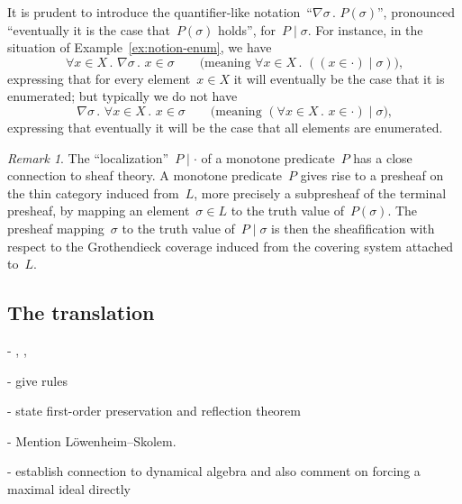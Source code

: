 \documentclass[com,11pt,crcready]{iosart2x}
\theoremstyle{definition}
\theoremstyle{plain}
\theoremstyle{remark}
\newtheorem{remark}[definition]{Remark}
\renewcommand{\_}{\mathpunct{.}\,}
\begin{document}
It is prudent to introduce the quantifier-like notation~``$\nabla \sigma\_
P(\sigma)$'', pronounced ``eventually it is the case that~$P(\sigma)$ holds'',
for~$P \mid \sigma$. For instance, in the situation of
Example~\ref{ex:notion-enum}, we have
\[ \forall x \in X\_ \nabla \sigma\_ x \in \sigma
\qquad\text{(meaning $\forall x \in X\_ ((x \in \cdot) \mid \sigma)$),} \]
expressing that for every element~$x \in X$ it will eventually be the case that
it is enumerated; but typically we do not have
\[ \nabla \sigma\_ \forall x \in X\_ x \in \sigma
\qquad\text{(meaning $(\forall x \in X\_ x \in \cdot) \mid \sigma$),} \]
expressing that eventually it will be the case that all elements are
enumerated.

\begin{remark}The ``localization''~$P \mid \cdot$ of a monotone predicate~$P$
has a close connection to sheaf theory. A monotone
predicate~$P$ gives rise to a presheaf on the thin category induced from~$L$,
more precisely a subpresheaf of the terminal presheaf, by mapping an
element~$\sigma \in L$ to the truth value of~$P(\sigma)$. The presheaf
mapping~$\sigma$ to the truth value of~$P \mid \sigma$ is then the
sheafification with respect to the Grothendieck coverage induced from the
covering system attached to~$L$.\end{remark}







\subsection{The translation}

- \cite[Theorem~2]{hamkins:multiverse},
  \cite[Section~4]{maddy-meadows:reconstruction},
  \cite{barton:forcing}

- give rules

- state first-order preservation and reflection theorem

- Mention
  Löwenheim--Skolem.

- establish connection to dynamical algebra and also comment on
  forcing a maximal ideal directly
\end{document}
